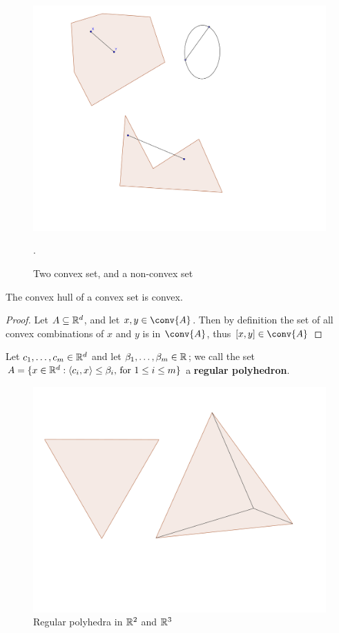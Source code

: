 \begin{figure}
    \centering
    \includegraphics[scale = 0.2]{Figures/convexSets.png}
    \caption{Two convex set, and a non-convex set}.
    \label{fig1.1}
\end{figure}

\begin{lemma}\label{1.1.1}
    The convex hull of a convex set is convex.
\end{lemma}
\begin{proof}
    Let $A \subseteq \mathbb{R}^d$, and let $x,y \in \conv{A}$. Then by definition the set of all convex 
    combinations of $x$ and  $y$ is in  $\conv{A}$, thus  $[x,y] \in \conv{A}$
\end{proof}

\begin{definition}
    Let $c_1, \dots, c_m \in \mathbb{R}^d$ and let $\beta_1, \dots, \beta_m \in \mathbb{R}$; we call the set 
    $A=\{x \in \mathbb{R}^d: \langle{c_i,x}\rangle \leq \beta_i \text{, for } 1 \leq i \leq m\}$ a 
    \textbf{ regular polyhedron}.
\end{definition}

\begin{figure} 
    \centering
    \includegraphics[scale = 0.3]{Figures/regularPolyhedra.png}
    \caption{Regular polyhedra in $\mathbb{R}^2$ and  $\mathbb{R}^3$}
\end{figure}

